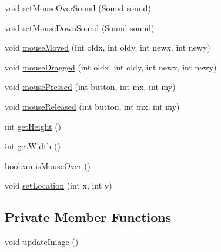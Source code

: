 \begin{DoxyCompactItemize}
\item 
void \mbox{\hyperlink{classorg_1_1newdawn_1_1slick_1_1gui_1_1_mouse_over_area_afdfa653a143d7502d4b368d094a0b24a}{set\+Mouse\+Over\+Sound}} (\mbox{\hyperlink{classorg_1_1newdawn_1_1slick_1_1_sound}{Sound}} sound)
\item 
void \mbox{\hyperlink{classorg_1_1newdawn_1_1slick_1_1gui_1_1_mouse_over_area_a3a2b109241fbb8d32eb3a1ea036f2daa}{set\+Mouse\+Down\+Sound}} (\mbox{\hyperlink{classorg_1_1newdawn_1_1slick_1_1_sound}{Sound}} sound)
\item 
void \mbox{\hyperlink{classorg_1_1newdawn_1_1slick_1_1gui_1_1_mouse_over_area_a3fbca2800bd827846e958116b97d4364}{mouse\+Moved}} (int oldx, int oldy, int newx, int newy)
\item 
void \mbox{\hyperlink{classorg_1_1newdawn_1_1slick_1_1gui_1_1_mouse_over_area_a425742d2c0b0bd51f4eee03b5b0083ba}{mouse\+Dragged}} (int oldx, int oldy, int newx, int newy)
\item 
void \mbox{\hyperlink{classorg_1_1newdawn_1_1slick_1_1gui_1_1_mouse_over_area_a5d0f752e776cba0ca2a7a651236d6853}{mouse\+Pressed}} (int button, int mx, int my)
\item 
void \mbox{\hyperlink{classorg_1_1newdawn_1_1slick_1_1gui_1_1_mouse_over_area_a7194a272562a8cf50f92b7c60e660132}{mouse\+Released}} (int button, int mx, int my)
\item 
int \mbox{\hyperlink{classorg_1_1newdawn_1_1slick_1_1gui_1_1_mouse_over_area_a216ac5bebcca2e6437b0bbd832934d99}{get\+Height}} ()
\item 
int \mbox{\hyperlink{classorg_1_1newdawn_1_1slick_1_1gui_1_1_mouse_over_area_aaf39ffca45d9f2907f597f9e283f8eec}{get\+Width}} ()
\item 
boolean \mbox{\hyperlink{classorg_1_1newdawn_1_1slick_1_1gui_1_1_mouse_over_area_aafc58751a53e278a9f9281cfc1d664be}{is\+Mouse\+Over}} ()
\item 
void \mbox{\hyperlink{classorg_1_1newdawn_1_1slick_1_1gui_1_1_mouse_over_area_a4857ffc646aa61fcabfc81a501ce3281}{set\+Location}} (int x, int y)
\end{DoxyCompactItemize}
\subsection*{Private Member Functions}
\begin{DoxyCompactItemize}
\item 
void \mbox{\hyperlink{classorg_1_1newdawn_1_1slick_1_1gui_1_1_mouse_over_area_a3af680d0cd12aa68926e1fa10a6c94fa}{update\+Image}} ()
\end{DoxyCompactItemize}
